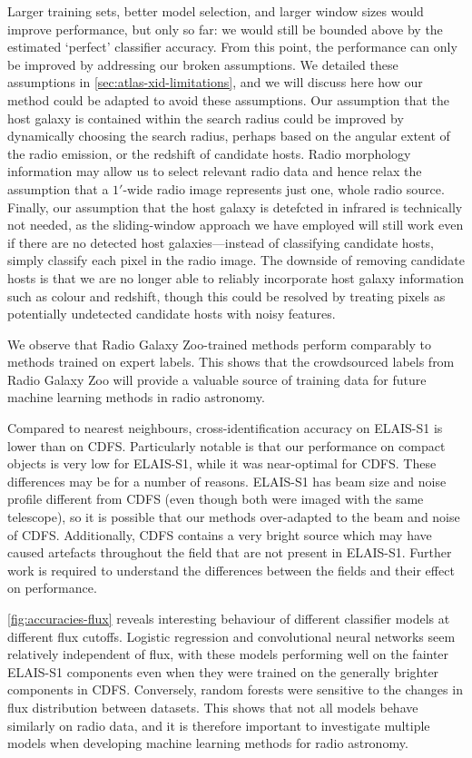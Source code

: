   Larger training sets, better model selection, and larger window sizes would
  improve performance, but only so far: we would still be bounded above by the
  estimated `perfect' classifier accuracy. From this point, the performance
  can only be improved by addressing our broken assumptions. We detailed
  these assumptions in \autoref{sec:atlas-xid-limitations}, and we will discuss here how
  {our method could be adapted to avoid these assumptions}. Our assumption that the host galaxy is contained
  within the search radius could be improved by dynamically choosing the
  search radius, perhaps based on the angular extent of the radio emission, or the
  redshift of candidate hosts. Radio morphology information may allow us to
  select relevant radio data and hence relax the assumption that a $1'$-wide
  radio image represents just one, whole radio source. Finally, our assumption
  that the host galaxy is detefcted in infrared is technically not needed, as
  the sliding-window approach we have employed will still work even if there
  are no detected host galaxies---instead of classifying candidate hosts,
  simply classify each pixel in the radio image. The downside of removing
  candidate hosts is that we are no longer able to reliably incorporate host
  galaxy information such as colour and redshift, though this could be
  resolved by treating pixels as potentially undetected candidate hosts with
  noisy features.

  We observe that Radio Galaxy Zoo-trained methods perform comparably to
  methods trained on expert labels. This shows that the crowdsourced labels
  from Radio Galaxy Zoo will provide a valuable source of training
  data for future machine learning methods in radio astronomy.

  Compared to nearest neighbours, cross-identification accuracy on ELAIS-S1 is
  lower than on CDFS. Particularly notable is that our performance on compact
  objects is very low for ELAIS-S1, while it was near-optimal for CDFS. These
  differences may be for a number of reasons. ELAIS-S1 has beam size and noise
  profile different from CDFS (even though both were imaged with the same
  telescope), so it is possible that our methods over-adapted to the beam and
  noise of CDFS. Additionally, CDFS contains a very bright source which may
  have caused artefacts throughout the field that are not present in ELAIS-S1.
  Further work is required to understand the differences between the fields
  and their effect on performance.

  \autoref{fig:accuracies-flux} reveals interesting behaviour of different
  classifier models at different flux cutoffs. Logistic regression and
  convolutional neural networks seem relatively independent of flux, with
  these models performing well on the fainter ELAIS-S1 components even when
  they were trained on the generally brighter components in CDFS. Conversely,
  random forests were sensitive to the changes in flux distribution between
  datasets. This shows that not all models behave similarly on radio data,
  and it is therefore important to investigate multiple models when
  developing machine learning methods for radio astronomy.

